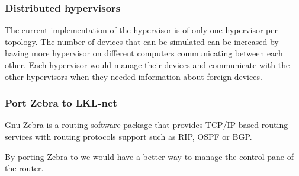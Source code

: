 \subsubsection{Distributed hypervisors}

The current implementation of the hypervisor is of only one hypervisor per topology. The number of devices that can be
simulated can be increased by having more hypervisor on different computers communicating between each other. Each hypervisor 
would manage their devices and communicate with the other hypervisors when they needed information about foreign devices.

\subsubsection{Port Zebra to LKL-net}

Gnu Zebra is a routing software package that provides TCP/IP based routing services with routing protocols support such
as RIP, OSPF or BGP. 

By porting Zebra to \textbf{\project} we would have a better way to manage the control pane of the router.
